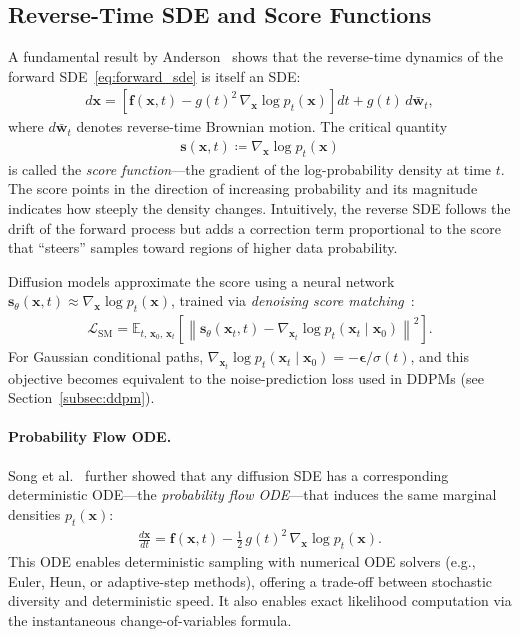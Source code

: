 \subsection{Reverse-Time SDE and Score Functions}
\label{subsec:reverse_sde}

A fundamental result by Anderson~\cite{anderson1982reverse} shows that the reverse-time dynamics of the forward SDE~\eqref{eq:forward_sde} is itself an SDE:
\begin{align}
    d\mathbf{x} = \left[\mathbf{f}(\mathbf{x}, t) - g(t)^2\,\nabla_{\mathbf{x}} \log p_t(\mathbf{x})\right] dt + g(t)\, d\bar{\mathbf{w}}_t,
    \label{eq:reverse_sde}
\end{align}
where $d\bar{\mathbf{w}}_t$ denotes reverse-time Brownian motion. The critical quantity
\begin{align}
    \mathbf{s}(\mathbf{x}, t) \coloneqq \nabla_{\mathbf{x}} \log p_t(\mathbf{x})
    \label{eq:score_function}
\end{align}
is called the \emph{score function}---the gradient of the log-probability density at time $t$. The score points in the direction of increasing probability and its magnitude indicates how steeply the density changes. Intuitively, the reverse SDE follows the drift of the forward process but adds a correction term proportional to the score that ``steers'' samples toward regions of higher data probability.

Diffusion models approximate the score using a neural network $\mathbf{s}_\theta(\mathbf{x}, t) \approx \nabla_{\mathbf{x}} \log p_t(\mathbf{x})$, trained via \emph{denoising score matching}~\cite{song2021scorebased}:
\begin{align}
    \mathcal{L}_{\text{SM}} = \mathbb{E}_{t,\, \mathbf{x}_0,\, \mathbf{x}_t}\!\left[\left\|\mathbf{s}_\theta(\mathbf{x}_t, t) - \nabla_{\mathbf{x}_t} \log p_t(\mathbf{x}_t \mid \mathbf{x}_0)\right\|^2\right].
    \label{eq:score_matching}
\end{align}
For Gaussian conditional paths, $\nabla_{\mathbf{x}_t} \log p_t(\mathbf{x}_t \mid \mathbf{x}_0) = -\boldsymbol{\epsilon} / \sigma(t)$, and this objective becomes equivalent to the noise-prediction loss used in DDPMs (see Section~\ref{subsec:ddpm}).

\paragraph{Probability Flow ODE.}
Song et al.~\cite{song2021scorebased} further showed that any diffusion SDE has a corresponding deterministic ODE---the \emph{probability flow ODE}---that induces the same marginal densities $p_t(\mathbf{x})$:
\begin{align}
    \frac{d\mathbf{x}}{dt} = \mathbf{f}(\mathbf{x}, t) - \frac{1}{2}\,g(t)^2\,\nabla_{\mathbf{x}} \log p_t(\mathbf{x}).
    \label{eq:prob_flow_ode}
\end{align}
This ODE enables deterministic sampling with numerical ODE solvers (e.g., Euler, Heun, or adaptive-step methods), offering a trade-off between stochastic diversity and deterministic speed. It also enables exact likelihood computation via the instantaneous change-of-variables formula.

